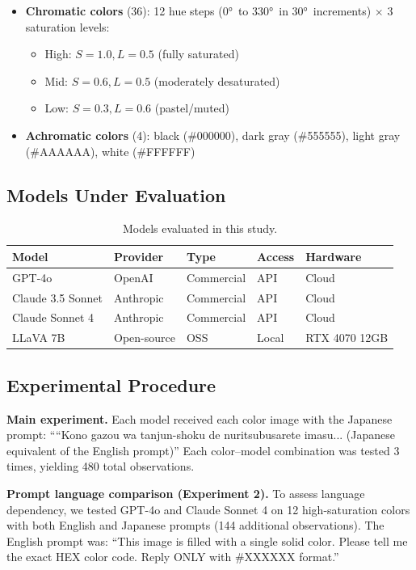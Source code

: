 \documentclass[11pt,a4paper]{article}
\begin{document}
\begin{itemize}
    \item \textbf{Chromatic colors} (36): 12 hue steps (0°\ to 330°\ in 30°\ increments) $\times$ 3 saturation levels:
    \begin{itemize}
        \item High: $S=1.0, L=0.5$ (fully saturated)
        \item Mid: $S=0.6, L=0.5$ (moderately desaturated)
        \item Low: $S=0.3, L=0.6$ (pastel/muted)
    \end{itemize}
    \item \textbf{Achromatic colors} (4): black (\#000000), dark gray (\#555555), light gray (\#AAAAAA), white (\#FFFFFF)
\end{itemize}

\subsection{Models Under Evaluation}

\begin{table}[H]
\centering
\caption{Models evaluated in this study.}
\label{tab:models}
\begin{tabular}{lllll}
\toprule
\textbf{Model} & \textbf{Provider} & \textbf{Type} & \textbf{Access} & \textbf{Hardware} \\
\midrule
GPT-4o & OpenAI & Commercial & API & Cloud \\
Claude 3.5 Sonnet & Anthropic & Commercial & API & Cloud \\
Claude Sonnet 4 & Anthropic & Commercial & API & Cloud \\
LLaVA 7B & Open-source & OSS & Local & RTX 4070 12GB \\
\bottomrule
\end{tabular}
\end{table}

\subsection{Experimental Procedure}

\textbf{Main experiment.} Each model received each color image with the Japanese prompt: ````Kono gazou wa tanjun-shoku de nuritsubusarete imasu... (Japanese equivalent of the English prompt)'' Each color--model combination was tested 3 times, yielding 480 total observations.

\textbf{Prompt language comparison (Experiment 2).} To assess language dependency, we tested GPT-4o and Claude Sonnet 4 on 12 high-saturation colors with both English and Japanese prompts (144 additional observations). The English prompt was: ``This image is filled with a single solid color. Please tell me the exact HEX color code. Reply ONLY with \#XXXXXX format.''
\end{document}
